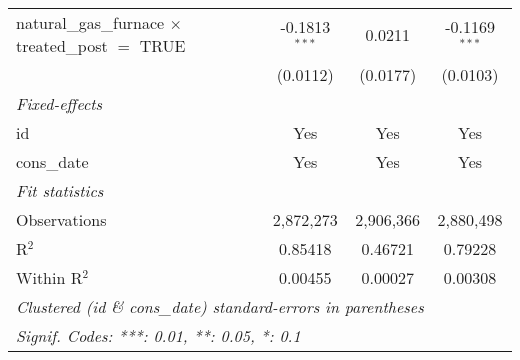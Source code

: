 \begin{tabular}{lccc}
   natural\_gas\_furnace $\times$ treated\_post $=$ TRUE     & -0.1813$^{***}$ & 0.0211          & -0.1169$^{***}$\\   
                                                             & (0.0112)        & (0.0177)        & (0.0103)\\   
   \midrule
   \emph{Fixed-effects}\\
   id                                                        & Yes             & Yes             & Yes\\  
   cons\_date                                                & Yes             & Yes             & Yes\\  
   \midrule
   \emph{Fit statistics}\\
   Observations                                              & 2,872,273       & 2,906,366       & 2,880,498\\  
   R$^2$                                                     & 0.85418         & 0.46721         & 0.79228\\  
   Within R$^2$                                              & 0.00455         & 0.00027         & 0.00308\\  
   \midrule \midrule
   \multicolumn{4}{l}{\emph{Clustered (id \& cons\_date) standard-errors in parentheses}}\\
   \multicolumn{4}{l}{\emph{Signif. Codes: ***: 0.01, **: 0.05, *: 0.1}}\\
\end{tabular}
\par\endgroup



